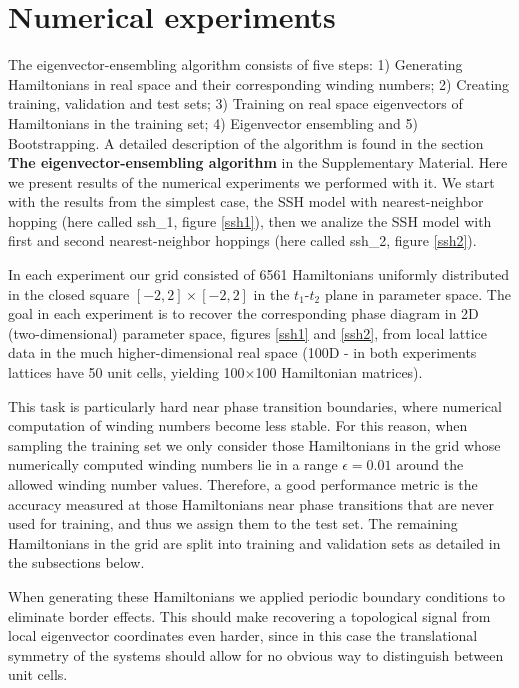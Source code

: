 \documentclass[fleqn,10pt]{wlscirep}
\begin{document}
\section*{Numerical experiments}

The eigenvector-ensembling algorithm consists of five steps: 1) Generating Hamiltonians in real space and their corresponding winding numbers; 2) Creating training, validation and test sets; 3) Training on real space eigenvectors of Hamiltonians in the training set; 4) Eigenvector ensembling and 5) Bootstrapping. A detailed description of the algorithm is found in the section \textbf{The eigenvector-ensembling algorithm} in the Supplementary Material. Here we present results of the numerical experiments we performed with it. We start with the results from the simplest case, the SSH model with nearest-neighbor hopping (here called ssh\_1, figure \ref{ssh1}), then we analize the SSH model with first and second nearest-neighbor hoppings (here called ssh\_2, figure \ref{ssh2}).

In each experiment our grid consisted of 6561 Hamiltonians uniformly distributed in the closed square $[-2,2]\times[-2,2]$ in the $t_1$-$t_2$ plane in parameter space. The goal in each experiment is to recover the corresponding phase diagram in 2D (two-dimensional) parameter space, figures \ref{ssh1} and \ref{ssh2}, from local lattice data in the much higher-dimensional real space (100D - in both experiments lattices have 50 unit cells, yielding 100$\times$100 Hamiltonian matrices).

This task is particularly hard near phase transition boundaries, where numerical computation of winding numbers become less stable. For this reason, when sampling the training set we only consider those Hamiltonians in the grid whose numerically computed winding numbers lie in a range $\epsilon = 0.01$ around the allowed winding number values. Therefore, a good performance metric is the accuracy measured at those Hamiltonians near phase transitions that are never used for training, and thus we assign them to the test set. The remaining Hamiltonians in the grid are split into training and validation sets as detailed in the subsections below.

When generating these Hamiltonians we applied periodic boundary conditions to eliminate border effects. This should make recovering a topological signal from local eigenvector coordinates even harder, since in this case the translational symmetry of the systems should allow for no obvious way to distinguish between unit cells.
\end{document}
